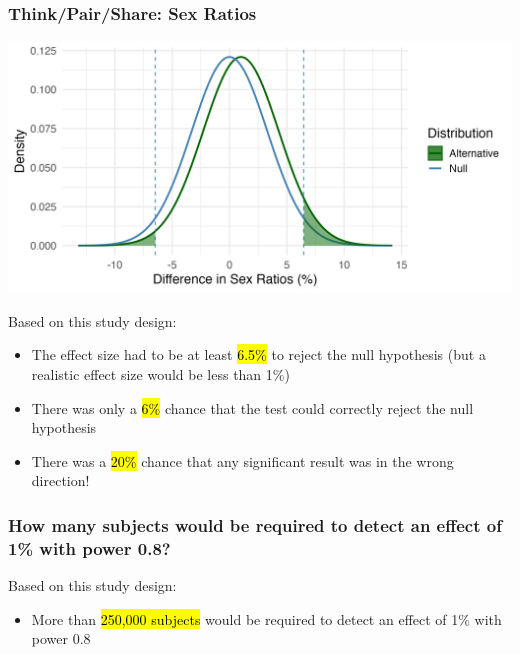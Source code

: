 \documentclass[slidestop,compress,mathserif]{beamer}
\newcommand{\solnGr}[1]{#1}
\begin{document}

\solnGr{
\begin{frame}
	\frametitle{Think/Pair/Share: Sex Ratios}
	\begin{center}
		\includegraphics[height=0.4\textheight]{figures/whatif_sexratio.png}
	\end{center}
	\small{
	Based on this study design:
	\begin{itemize}
		\item The effect size had to be at least \hl{6.5\%} to reject the null hypothesis (but a realistic effect size would be less than 1\%)
		\item There was only a \hl{6\%} chance that the test could correctly reject the null hypothesis
		\item There was a \hl{20\%} chance that any significant result was in the wrong direction!
	\end{itemize}
	}
\end{frame}
}


\begin{frame}
\frametitle{How many subjects would be required to detect an effect of 1\% with power 0.8?}
	Based on this study design:
	\begin{itemize}
		\item More than \hl{250,000 subjects} would be required to detect an effect of 1\% with power 0.8
	\end{itemize}
\end{frame}
	
\end{document}
